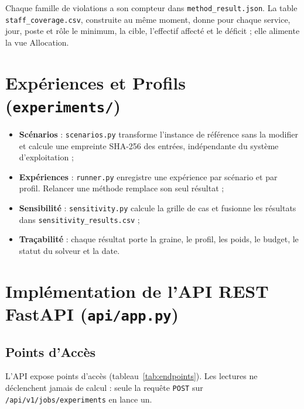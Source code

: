 Chaque famille de violations a son compteur dans \texttt{method\_result.json}. La table \texttt{staff\_coverage.csv}, construite au même moment, donne pour chaque service, jour, poste et rôle le minimum, la cible, l'effectif affecté et le déficit ; elle alimente la vue Allocation.

\section{Expériences et Profils (\texttt{experiments/})}

\begin{itemize}
    \item \textbf{Scénarios} : \texttt{scenarios.py} transforme l'instance de référence sans la modifier et calcule une empreinte SHA-256 des entrées, indépendante du système d'exploitation ;
    \item \textbf{Expériences} : \texttt{runner.py} enregistre une expérience par scénario et par profil. Relancer une méthode remplace son seul résultat ;
    \item \textbf{Sensibilité} : \texttt{sensitivity.py} calcule la grille de \NbCas{} cas et fusionne les résultats dans \texttt{sensitivity\_results.csv} ;
    \item \textbf{Traçabilité} : chaque résultat porte la graine, le profil, les poids, le budget, le statut du solveur et la date.
\end{itemize}

\section{Implémentation de l'API REST FastAPI (\texttt{api/app.py})}

\subsection{Points d'Accès}
L'API expose \NbEndpoints{} points d'accès (tableau~\ref{tab:endpoints}). Les lectures ne déclenchent jamais de calcul : seule la requête \texttt{POST} sur \texttt{/api/v1/jobs/experiments} en lance un.



